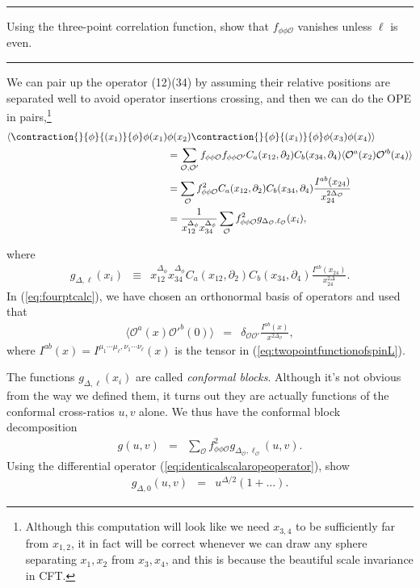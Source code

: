 \documentclass[12pt]{article}
\numberwithin{equation}{section}
\newcommand\be{\begin{eqnarray}}
\newcommand\ee{\end{eqnarray}}
\newcommand\f\phi
\newcommand\cO{\mathcal{O}}
\newcommand\p[1]{\left(#1\right)}
\newcommand\ptl\partial
\newcommand\<\langle
\renewcommand\>\rangle
\newcommand\de\delta
\newcommand\nn{\nonumber}
\renewcommand\.{\cdot}
\newcommand\SO{\mathrm{SO}}
\newcommand\De{\Delta}
\begin{document}

\noindent\rule[0.5ex]{\linewidth}{1pt}
\label{exercise:elleven}
Using the three-point correlation function, show that $f_{\f\f\cO}$ vanishes unless $\ell$ is even.

\noindent\rule[0.5ex]{\linewidth}{1pt}

We can pair up the operator (12)(34) by assuming their relative positions are separated well to avoid operator insertions crossing, and then we can do the OPE in pairs,\footnote{Although this computation will look like we need $x_{3,4}$ to be sufficiently far from $x_{1,2}$, it in fact will be correct whenever we can draw any sphere separating $x_1,x_2$ from $x_3,x_4$, and this is because the beautiful scale invariance in CFT.}
\begin{align}
\label{eq:fourptcalc}
\<
\contraction{}{\f}{(x_1)}{\f}
\f(x_1)&\f(x_2)
\contraction{}{\f}{(x_1)}{\f}
\f(x_3)\f(x_4)
\>\nn\\
&= \sum_{\cO,\cO'}f_{\f\f\cO}f_{\f\f\cO'} C_a(x_{12},\ptl_2)C_b(x_{34},\ptl_4)\<\cO^a(x_2)\cO'^b(x_4)\>\nn\\
&= \sum_\cO f_{\f\f\cO}^2 C_a(x_{12},\ptl_2)C_b(x_{34},\ptl_4)\frac{I^{ab}(x_{24})}{x_{24}^{2\De_\cO}}\nn\\
&= \frac{1}{x_{12}^{\De_\f} x_{34}^{\De_\f}}\sum_\cO f_{\f\f\cO}^2 g_{\De_\cO,\ell_\cO}(x_i),
\end{align}

where
\be
\label{eq:olddefinitionofg}
g_{\De,\ell}(x_i) &\equiv& x_{12}^{\De_\f} x_{34}^{\De_\f} C_a(x_{12},\ptl_2)C_b(x_{34},\ptl_4)\frac{I^{ab}(x_{24})}{x_{24}^{2\De}}.
\ee
In (\ref{eq:fourptcalc}), we have chosen an orthonormal basis of operators and used that
\be
\label{eq:canonicallynormalizedtwopt}
\<\cO^a(x)\cO'^b(0)\> &=& \de_{\cO\cO'} \frac{I^{ab}(x)}{x^{2\De_\cO}},
\ee
where $I^{ab}(x)=I^{\mu_1\cdots\mu_\ell,\nu_1\cdots\nu_\ell}(x)$ is the tensor in (\ref{eq:twopointfunctionofspinL}).

The functions $g_{\De,\ell}(x_i)$ are called {\it conformal blocks}.  Although it's not obvious from the way we defined them, it turns out they are actually functions of the conformal cross-ratios $u,v$ alone.  We thus have the conformal block decomposition
\be
g(u,v) &=& \sum_\cO f_{\f\f\cO}^2 g_{\De_\cO,\ell_\cO}(u,v).
\ee
Using the differential operator (\ref{eq:identicalscalaropeoperator}), show
\be
\label{eq:boundaryconditionforblock}
g_{\De,0}(u,v) &=& u^{\De/2}\p{1+\dots}.
\ee
\end{document}
